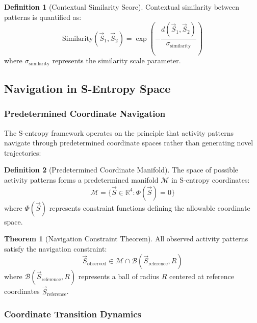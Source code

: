 \documentclass[12pt,a4paper]{article}
\theoremstyle{definition}
\newtheorem{definition}{Definition}[section]
\newtheorem{theorem}{Theorem}[section]
\begin{document}
\begin{definition}[Contextual Similarity Score]
Contextual similarity between patterns is quantified as:
\begin{equation}
\text{Similarity}(\vec{S}_1, \vec{S}_2) = \exp\left(-\frac{d(\vec{S}_1, \vec{S}_2)}{\sigma_{\text{similarity}}}\right)
\end{equation}
where $\sigma_{\text{similarity}}$ represents the similarity scale parameter.
\end{definition}

\subsection{Navigation in S-Entropy Space}

\subsubsection{Predetermined Coordinate Navigation}

The S-entropy framework operates on the principle that activity patterns navigate through predetermined coordinate spaces rather than generating novel trajectories:

\begin{definition}[Predetermined Coordinate Manifold]
The space of possible activity patterns forms a predetermined manifold $\mathcal{M}$ in S-entropy coordinates:
\begin{equation}
\mathcal{M} = \{\vec{S} \in \mathbb{R}^4 : \Phi(\vec{S}) = 0\}
\end{equation}
where $\Phi(\vec{S})$ represents constraint functions defining the allowable coordinate space.
\end{definition}

\begin{theorem}[Navigation Constraint Theorem]
All observed activity patterns satisfy the navigation constraint:
\begin{equation}
\vec{S}_{\text{observed}} \in \mathcal{M} \cap \mathcal{B}(\vec{S}_{\text{reference}}, R)
\end{equation}
where $\mathcal{B}(\vec{S}_{\text{reference}}, R)$ represents a ball of radius $R$ centered at reference coordinates $\vec{S}_{\text{reference}}$.
\end{theorem}

\subsubsection{Coordinate Transition Dynamics}
\end{document}

